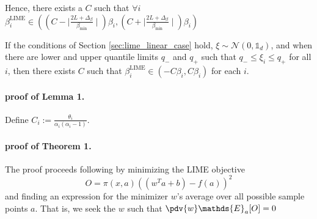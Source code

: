         Hence, there exists a $C$ such that $\forall i$ $\beta^{\text{LIME}}_i \in ((C - \mid \frac{2L + \Delta_{\beta}}{\beta_{\text{min}}} \mid)\beta_i, (C+\mid \frac{2L + \Delta_{\beta}}{\beta_{\text{min}}}\mid)\beta_i)$


            \begin{theorem}
                \label{thm:lime_C}
                If the conditions of Section \ref{sec:lime_linear_case} hold, $\xi \sim \mathcal{N}(0,\mathds{1}_d)$, and when there are lower and upper quantile limits $q_-$ and $q_+$ such that $q_- \leq \xi_i \leq q_+$ for all $i$,  then there exists $C$ such that $\beta^{\text{LIME}}_i  \in (-C \beta_i, C\beta_i)$ for each $i$.
            \end{theorem}
  \paragraph{proof of Lemma 1.}
        Define $C_i := \frac{\theta_i}{\alpha_i(\alpha_i-1)}$.

  \paragraph{proof of Theorem 1.}
        The proof proceeds following \citep{agarwal21clime} by minimizing the LIME objective
            \begin{equation*}
                O = \pi(x,a)((w^Ta + b) - f(a))^2
            \end{equation*}
        and finding an expression for the minimizer $w$'s average over all possible sample points $a$. 
        That is, we seek the $w$ such that $\pdv{w}\mathds{E}_a[O]=0$
  
